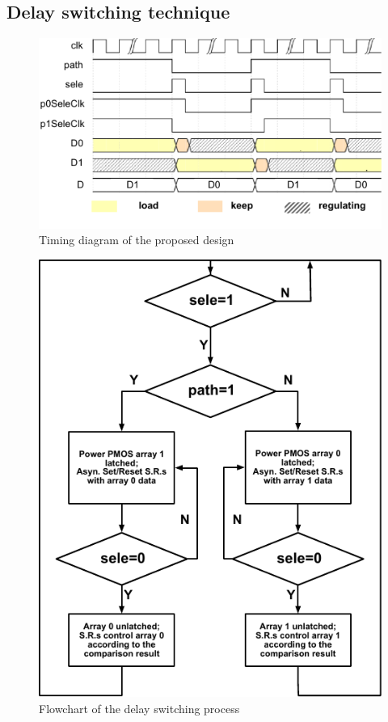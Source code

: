 \documentclass[journal]{IEEEtran}
\begin{document}
\subsection{Delay switching technique}
\begin{figure}[t!]
    \centering
    \includegraphics[width=\linewidth]{pic/struc/timing.pdf}
    \caption{Timing diagram of the proposed design}
    \label{fig:timing}
\end{figure}
\begin{figure}[t!]
    \centering
    \includegraphics[width=0.9\linewidth]{pic/struc/flowChart.pdf}
    \caption{Flowchart of the delay switching process}
    \label{fig:flowchart}
\end{figure}
\end{document}
